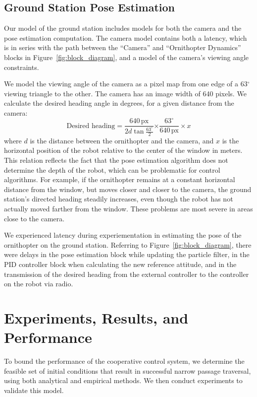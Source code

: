 \documentclass{aamas2013}
\begin{document}
\subsection{Ground Station Pose Estimation}

Our model of the ground station includes models for both the camera and the
pose estimation computation. The camera model contains both a latency, which 
is in series with the path between the ``Camera'' and 
``Ornithopter Dynamics'' blocks in Figure~\ref{fig:block_diagram}, and a 
model of the camera's viewing angle constraints.
 
We model the viewing angle of the camera as a pixel map from one edge of a 
63$^{\circ}$ viewing triangle to the other. The camera has an image width of 
640 pixels. We calculate the desired heading angle in degrees, for a given 
distance from the camera:
\begin{equation} 
\label{eq:desired_heading} 
\text{Desired heading} = \frac{640\,\text{px}}{2d\tan{\frac{63^{\circ}}{2}}}{\times\frac{63^{\circ}}{640\,\text{px}}\times x}
\end{equation}
where $d$ is the distance between the ornithopter and the camera, and $x$ is 
the horizontal position of the robot relative to the center of the window in 
meters. This relation reflects the fact that the pose estimation algorithm 
does not determine the depth of the robot, which can be problematic for 
control algorithms. For example, if the ornithopter remains at a constant 
horizontal distance from the window, but moves closer and closer to the 
camera, the ground station's directed heading steadily increases, even 
though the robot has not actually moved farther from the window. These 
problems are most severe in areas close to the camera.

We experienced latency during experiementation in estimating the pose of the
ornithopter on the ground station. Referring to
Figure~\ref{fig:block_diagram}, there were delays in the pose estimation block
while updating the particle filter, in the PID controller block when
calculating the new reference attitude, and in the transmission of the desired
heading from the external controller to the controller on the robot via radio.

\section{Experiments, Results, and Performance}
\label{sec:performance}
To bound the performance of the cooperative control system, we determine 
the feasible set of initial conditions that result in successful narrow 
passage traversal, using both analytical and empirical methods. We then 
conduct experiments to validate this model.
\end{document}
